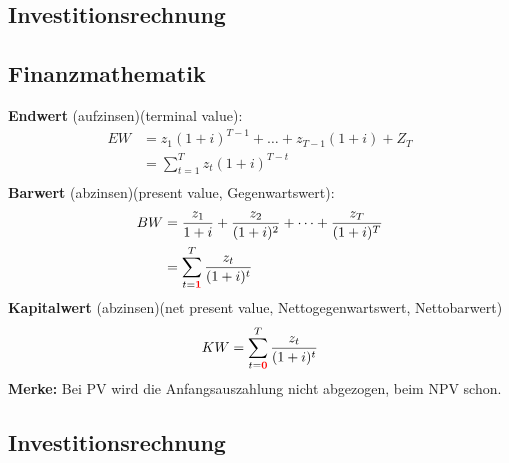 \documentclass[leqno]{scrartcl}
\begin{document}
\begin{multicols}{3}
\section{Investitionsrechnung}

\subsection{Finanzmathematik}

\textbf{Endwert} (aufzinsen)(terminal value):
  \begin{equation}
    \begin{split}
      EW &= z_1(1+i)^{T-1} + \dots + z_{T-1}(1+i) + Z_T \\
        &= \sum^T_{t=1} z_t (1+i)^{T-t}\\
    \end{split}
  \end{equation}
\textbf{Barwert} (abzinsen)(present value, Gegenwartswert):
  \begin{equation}
    \begin{split}
      BW &= \frac{z_1}{1+i}+\frac{z_2}{(1+i)^2}+\dots+\frac{z_T}{(1+i)^T}\\
          &= \sum^T_{t=\color{red}{\textbf{1}}}\frac{z_t}{(1+i)^t}\\
    \end{split}
  \end{equation}
\textbf{Kapitalwert} (abzinsen)(net present value‚ Nettogegenwartswert, Nettobarwert)
  \begin{equation}
    KW = \sum^T_{t=\color{red}{\textbf{0}}}\frac{z_t}{(1+i)^t}
  \end{equation}
\textbf{Merke:} Bei PV wird die Anfangsauszahlung nicht abgezogen, beim NPV schon.

\subsection{Investitionsrechnung}


\end{multicols}
\end{document}
